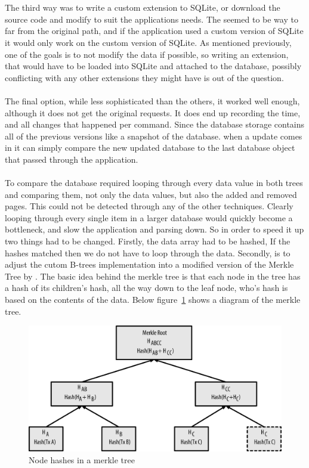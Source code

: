 \\\\
The third way was to write a custom extension to SQLite, or download the source code and modify to suit the applications needs. The seemed to be way to far from the original path, and if the application used a custom version of SQLite it would only work on the custom version of SQLite. As mentioned previously, one of the goals is to not modify the data if possible, so writing an extension, that would have to be loaded into SQLite and attached to the database, possibly conflicting with any other extensions they might have is out of the question.
\\\\
The final option, while less sophisticated than the others, it worked well enough, although it does not get the original requests. It does end up recording the time, and all changes that happened per command. Since the database storage contains all of the previous versions like a snapshot of the database. when a update comes in it can simply compare the new updated database to the last database object that passed through the application.
\\\\
To compare the database required looping through every data value in both trees and comparing them, not only the data values, but also the added and removed pages. This could not be detected through any of the other techniques. Clearly looping through every single item in a larger database would quickly become a bottleneck, and slow the application and parsing down. So in order to speed it up two things had to be changed. Firstly, the data array had to be hashed, If the hashes matched then we do not have to loop through the data. Secondly, is to adjust the cutom B-trees implementation into a modified version of the Merkle Tree by \cite{merkletree}. The basic idea behind the merkle tree is that each node in the tree has a hash of its children’s hash, all the way down to the leaf node, who's hash is based on the contents of the data. Below figure~\ref{fig:merkle_tree} shows a diagram of the merkle tree.

\begin{figure}[H]
	\centering
	\includegraphics[scale=1.0]{images/merkle_tree.png}
	\caption{Node hashes in a  merkle tree \citep{bitcoin}}
	\label{fig:merkle_tree}
\end{figure}

